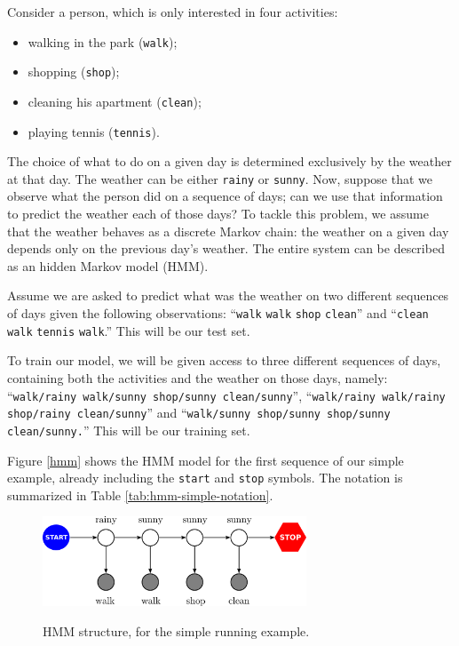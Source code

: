 \begin{example}

Consider a person, which is only interested in four activities: 
\begin{itemize}
\item walking in
the park ({\tt walk});
\item shopping ({\tt shop});
\item cleaning his apartment ({\tt clean});
\item playing tennis ({\tt tennis}).
\end{itemize}
The choice of what to do on a given day is determined exclusively by the weather at that day. The
weather can be either {\tt rainy} or {\tt sunny}. 
Now, suppose that we observe what the person did on a sequence of days; 
can we use that information to predict the weather each of those days? 
To tackle this problem, we assume 
that the weather behaves as a discrete Markov chain: the weather on a
given day depends only on 
the previous day's  weather. 
The entire system can be described as an hidden Markov model (HMM).

Assume we are asked to predict what was the weather on two different
sequences of days given the following observations: ``{\tt walk} {\tt walk} {\tt shop}
{\tt clean}''  and 
``{\tt clean} {\tt walk} {\tt tennis}
{\tt walk}.''
This will be our test set.

To train our model, we will be given access to three different sequences of
days, containing both the activities and the weather on those days, namely: 
``{\tt walk/rainy walk/sunny shop/sunny
clean/sunny}'', ``{\tt walk/rainy walk/rainy shop/rainy clean/sunny}'' and ``{\tt walk/sunny shop/sunny shop/sunny clean/sunny.}'' This
will be our training set.


Figure \ref{hmm} shows the HMM model for the first sequence of our simple
example, already including the {\tt start} and 
{\tt stop} symbols. The notation is summarized in Table \ref{tab:hmm-simple-notation}.
\end{example}
 



\begin{figure}[ht]
\centering
\includegraphics[width=0.7\textwidth]{figs/sequences/hmm_new}
\label{fig:hmm}
\caption[HMM running example]{HMM structure, for the simple
running example.}
\end{figure}

